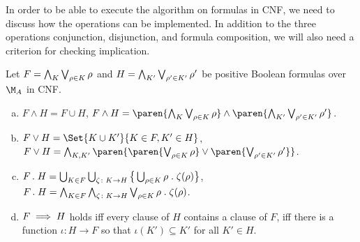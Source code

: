 \documentclass[../../diss.tex]{subfiles}
\begin{document}
In order to be able to execute the algorithm on formulas in CNF, we need to discuss how the operations can be implemented.
In addition to the three operations conjunction, disjunction, and formula composition, we will also need a criterion for checking implication.

\begin{lemma}%
\label{Lemma:CFGamesCNFOperations}%
    Let $F = \bigwedge_{K} \bigvee_{\tbox \in K} \tbox$ and $H = \bigwedge_{K'} \bigvee_{\tbox' \in K'} \tbox'$ be positive Boolean formulas over $\nfatransmonoid{A}$ in CNF.\@
    \begin{enumerate}[a)]
        \item
            $F \wedge H = F \cup H$,
            \ie $F \wedge H = \paren{ \bigwedge_{K} \bigvee_{\tbox \in K} \tbox} \wedge \paren{\bigwedge_{K'} \bigvee_{\tbox' \in K'} \tbox'}$.
        \item
            $F \vee H = \Set{ K \cup K' }{K \in F, K' \in H}$,
            \ie $F \vee H = \bigwedge_{K, K'} \paren{ \paren{ \bigvee_{\tbox \in K} \tbox } \vee  \paren{ \bigvee_{\tbox' \in K'} \tbox'} }$.
        \item
            $F \comp H = \bigcup_{K \in F} \bigcup_{\zeta \colon K \to H} \big\{ \bigcup_{\tbox \in K } \tbox \comp \zeta(\tbox)\big\}$,
            \ie $F \comp H = \bigwedge_{K \in F} \bigwedge_{\zeta \colon K \to H} \bigvee_{\tbox \in K } \tbox \comp \zeta(\tbox)$.
        \item
            $F \implies H$ holds iff every clause of $H$ contains a clause of $F$,
            \ie iff there is a function $\iota \colon H \to F$ so that $\iota(K') \subseteq K'$ for all $K' \in H$.
    \end{enumerate}
\end{lemma}
\end{document}

